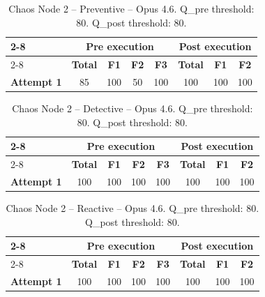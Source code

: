 \begin{table}[h]
\centering
\begin{tabular}{l|cccc|ccc|}
\cline{2-8}
& \multicolumn{4}{c|}{\textbf{Pre execution}} & \multicolumn{3}{c|}{\textbf{Post execution}} \\
\cline{2-8}
& \textbf{Total} & \textbf{F1} & \textbf{F2} & \textbf{F3} & \textbf{Total} & \textbf{F1} & \textbf{F2} \\
\hline
\textbf{Attempt 1} & 85 & 100 & 50 & 100 & 100 & 100 & 100 \\
\hline
\end{tabular}
\caption{Chaos Node 2 -- Preventive -- Opus 4.6. Q\_pre threshold: 80. Q\_post threshold: 80.}
\label{tab:cn2_preventive_opus46}
\end{table}

\clearpage

\begin{table}[h]
\centering
\begin{tabular}{l|cccc|ccc|}
\cline{2-8}
& \multicolumn{4}{c|}{\textbf{Pre execution}} & \multicolumn{3}{c|}{\textbf{Post execution}} \\
\cline{2-8}
& \textbf{Total} & \textbf{F1} & \textbf{F2} & \textbf{F3} & \textbf{Total} & \textbf{F1} & \textbf{F2} \\
\hline
\textbf{Attempt 1} & 100 & 100 & 100 & 100 & 100 & 100 & 100 \\
\hline
\end{tabular}
\caption{Chaos Node 2 -- Detective -- Opus 4.6. Q\_pre threshold: 80. Q\_post threshold: 80.}
\label{tab:cn2_detective_opus46}
\end{table}

\begin{table}[h]
\centering
\begin{tabular}{l|cccc|ccc|}
\cline{2-8}
& \multicolumn{4}{c|}{\textbf{Pre execution}} & \multicolumn{3}{c|}{\textbf{Post execution}} \\
\cline{2-8}
& \textbf{Total} & \textbf{F1} & \textbf{F2} & \textbf{F3} & \textbf{Total} & \textbf{F1} & \textbf{F2} \\
\hline
\textbf{Attempt 1} & 100 & 100 & 100 & 100 & 100 & 100 & 100 \\
\hline
\end{tabular}
\caption{Chaos Node 2 -- Reactive -- Opus 4.6. Q\_pre threshold: 80. Q\_post threshold: 80.}
\label{tab:cn2_reactive_opus46}
\end{table}

